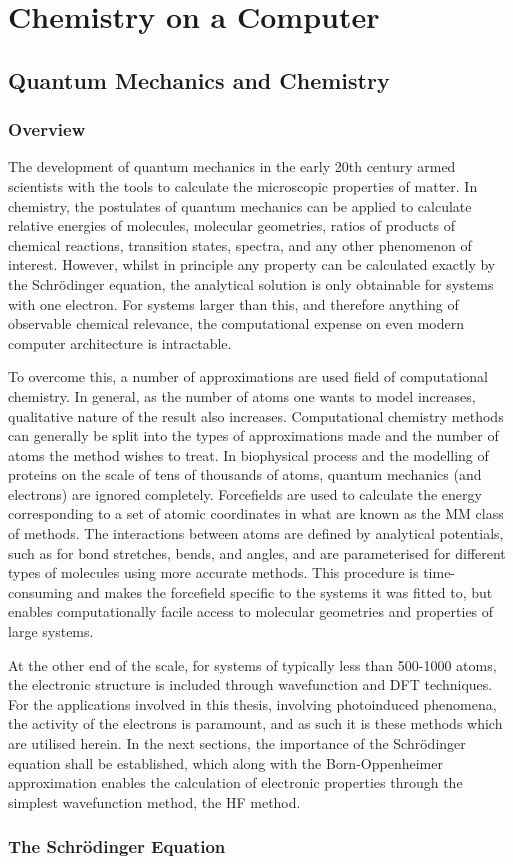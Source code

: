 \chapter{Chemistry on a Computer}
\newcommand{\schro}{Schr\"{o}dinger}
\label{chapter:theory}
\section{Quantum Mechanics and Chemistry}\label{section: theory}
\subsection{Overview}\label{section: theory_overview}
The development of quantum mechanics in the early 20th century armed scientists with the tools to calculate the microscopic properties of matter. In chemistry, the postulates of quantum mechanics can be applied to calculate relative energies of molecules, molecular geometries, ratios of products of chemical reactions, transition states, spectra, and any other phenomenon of interest. However, whilst in principle any property can be calculated exactly by the \schro{} equation, the analytical solution is only obtainable for systems with one electron. For systems larger than this, and therefore anything of observable chemical relevance, the computational expense on even modern computer architecture is intractable. 

To overcome this, a number of approximations are used field of computational chemistry. In general, as the number of atoms one wants to model increases, qualitative nature of the result also increases. Computational chemistry methods can generally be split into the types of approximations made and the number of atoms the method wishes to treat. In biophysical process and the modelling of proteins on the scale of tens of thousands of atoms, quantum mechanics (and electrons) are ignored completely. Forcefields are used to calculate the energy corresponding to a set of atomic coordinates in what are known as the \ac{MM} class of methods. The interactions between atoms are defined by analytical potentials, such as for bond stretches, bends, and angles, and are parameterised for different types of molecules using more accurate methods. This procedure is time-consuming and makes the forcefield specific to the systems it was fitted to, but enables computationally facile access to molecular geometries and properties of large systems.

At the other end of the scale, for systems of typically less than 500-1000 atoms, the electronic structure is included through wavefunction and \ac{DFT} techniques. For the applications involved in this thesis, involving photoinduced phenomena, the activity of the electrons is paramount, and as such it is these methods which are utilised herein. In the next sections, the importance of the \schro{} equation shall be established, which along with the Born-Oppenheimer approximation enables the calculation of electronic properties through the simplest wavefunction method, the \ac{HF} method. 
\subsection{The \schro{} Equation}\label{section: theory_schrodinger}